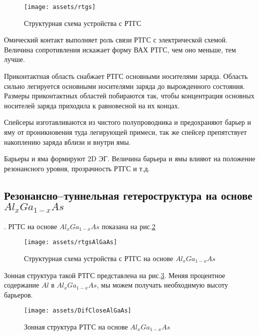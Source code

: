 \begin{figure}[h]
  \centering
  \texttt{[image: assets/rtgs]}
  \caption{Структурная схема устройства с РТГС}
  \label{img:rtgs}
\end{figure}

Омический контакт выполняет роль связи РТГС с электрической схемой. Величина сопротивления искажает форму ВАХ РТГС, чем оно меньше, тем лучше.

Приконтактная область снабжает РТГС основными носителями заряда. Область сильно легируется основными носителями заряда до вырожденного состояния. Размеры приконтактных областей побираются так, чтобы концентрация основных носителей заряда приходила к равновесной на их концах.

Спейсеры изготавливаются из чистого полупроводника и предохраняют барьер и яму от проникновения туда легирующей примеси, так же спейсер препятствует накоплению заряда вблизи и внутри ямы.

Барьеры и яма формируют 2D ЭГ. Величина барьера и ямы влияют на положение резонансного уровня, прозрачность РТГС и т.д.

\subsection{Резонансно--туннельная гетероструктура на основе $Al_{x}Ga_{1-x}As$}.
РГТС на основе $Al_{x}Ga_{1-x}As$ показана на рис.\ref{img:rtgsAlGaAs}
\begin{figure}[h]
  \centering
  \texttt{[image: assets/rtgsAlGaAs]}
  \caption{Структурная схема устройства с РТГС на основе $Al_{x}Ga_{1-x}As$}
  \label{img:rtgsAlGaAs}
\end{figure}

Зонная структура такой РТГС представлена на рис.\ref{img:DifCloseAlGaAs}. Меняя процентное содержание $Al$ в $Al_{x}Ga_{1-x}As$, мы можем получать необходимую высоту барьеров.

\begin{figure}[h]
  \centering
  \texttt{[image: assets/DifCloseAlGaAs]}
  \caption{Зонная структура РТГС на основе $Al_{x}Ga_{1-x}As$}
  \label{img:DifCloseAlGaAs}
\end{figure}



